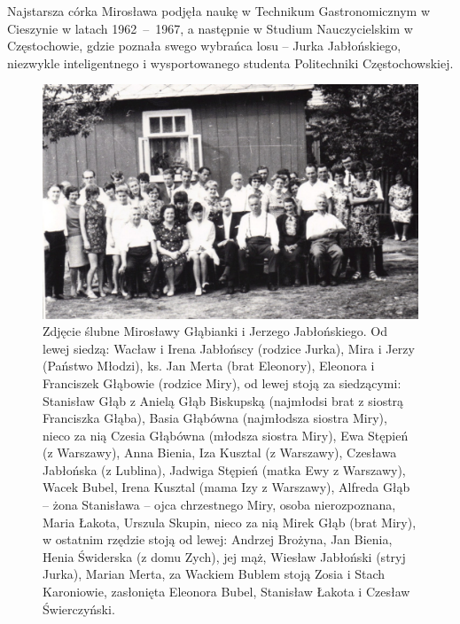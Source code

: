 Najstarsza córka Mirosława podjęła naukę w Technikum Gastronomicznym w Cieszynie w latach 1962~--~1967, a następnie w Studium Nauczycielskim w Częstochowie, gdzie poznała swego wybrańca losu -- Jurka Jabłońskiego, niezwykle inteligentnego i wysportowanego studenta Politechniki Częstochowskiej.

\begin{figure}[!hb]
\begin{center}
\includegraphics[width=\textwidth]{zdjecia/slub_jerzego_i_miroslawy_jablonskich_zbiorowe.jpg}
\caption[Zbiorowe zdjęcie ślubne Mirosławy i Jerzego Jabłońskich]{Zdjęcie ślubne Mirosławy Głąbianki i Jerzego Jabłońskiego. Od lewej siedzą: Wacław i Irena Jabłońscy (rodzice Jurka), Mira i Jerzy (Państwo Młodzi), ks. Jan Merta (brat Eleonory), Eleonora i Franciszek Głąbowie (rodzice Miry), od lewej stoją za siedzącymi: Stanisław Głąb z Anielą Głąb Biskupską (najmłodsi brat z siostrą Franciszka Głąba), Basia Głąbówna (najmłodsza siostra Miry), nieco za nią Czesia Głąbówna (młodsza siostra Miry), Ewa Stępień (z Warszawy), Anna Bienia, Iza Kusztal (z Warszawy), Czesława Jabłońska (z Lublina), Jadwiga Stępień (matka Ewy z Warszawy), Wacek Bubel, Irena Kusztal (mama Izy z Warszawy), Alfreda Głąb -- żona Stanisława -- ojca chrzestnego Miry, osoba nierozpoznana, Maria Łakota, Urszula Skupin, nieco za nią Mirek Głąb (brat Miry), w ostatnim rzędzie stoją od lewej: Andrzej Brożyna, Jan Bienia, Henia Świderska (z domu Zych), jej mąż, Wiesław Jabłoński (stryj Jurka), Marian Merta, za Wackiem Bublem stoją Zosia i Stach Karoniowie, zasłonięta Eleonora Bubel, Stanisław Łakota i Czesław Świerczyński.}
\label{rys:slub_jerzego_i_miroslawy_jablonskich_zbiorowe}
\end{center}
\end{figure}

